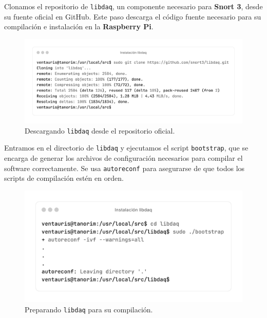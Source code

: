 \documentclass[11pt,a4paper,twoside]{report}
\begin{document}
\newpage

Clonamos el repositorio de \texttt{libdaq}, un componente necesario para \textbf{Snort 3}, desde su fuente oficial en GitHub. Este paso descarga el código fuente necesario para su compilación e instalación en la \textbf{Raspberry Pi}.

\begin{figure}[H]
	\centering
	\includegraphics[scale=0.12]{instalacion_snort/9-9.png}
	\caption{Descargando \texttt{libdaq} desde el repositorio oficial.}
\end{figure}

Entramos en el directorio de \texttt{libdaq} y ejecutamos el script \texttt{bootstrap}, que se encarga de generar los archivos de configuración necesarios para compilar el software correctamente. Se usa \texttt{autoreconf} para asegurarse de que todos los scripts de compilación estén en orden.

\begin{figure}[H]
	\centering
	\includegraphics[scale=0.12]{instalacion_snort/10-10.png}
	\caption{Preparando \texttt{libdaq} para su compilación.}
\end{figure}

\newpage

\end{document}
